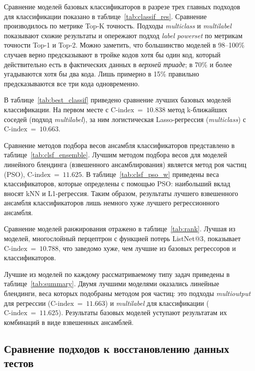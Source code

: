 Сравнение моделей базовых классификаторов в разрезе трех главных подходов для классификации показано в таблице~\ref{tab:classif_res}. Сравнение производилось по метрике Top-K точность. Подходы \emph{multiclass} и \emph{multilabel} показывают схожие результаты и опережают подход \emph{label powerset} по метрикам точности Top-1 и Top-2. Можно заметить, что большинство моделей в 98--100\% случаев верно предсказывают в тройке кодов хотя бы один код, который действительно есть в фактических данных в \emph{верхней триаде}; в 70\% и более угадываются хотя бы два кода. Лишь примерно в 15\% правильно предсказываются все три кода одновременно. 



В таблице~\ref{tab:best_classif} приведено сравнение лучших базовых моделей классификации. На первом месте с $\text{C‑index}~=~10.838$ метод k-ближайших соседей (подход \emph{multilabel}), за ним логистическая Lasso-регрессия (\emph{multiclass}) с $\text{C‑index}~=~10.663$.



Сравнение методов подбора весов ансамбля классификаторов представлено в таблице~\ref{tab:clsf_ensemble}. Лучшим методом подбора весов для моделей линейного блендинга (взвешенного ансамблирования) является метод роя частиц (PSO), $\text{C‑index}~=~11.625$. В таблице~\ref{tab:clsf_pso_w} приведены веса классификаторов, которые определены с помощью PSO: наибольший вклад вносят kNN и L1-регрессия. Таким образом, результаты лучшего взвешенного ансамбля классификаторов лишь немного хуже лучшего регрессионного ансамбля.



Сравнение моделей ранжирования отражено в таблице~\ref{tab:rank}. Лучшая из моделей, многослойный перцептрон с функцией потерь ListNet@3, показывает $\text{C‑index}~=~10.788$, что заведомо хуже, чем лучшие из базовых регрессоров и классификаторов.



Лучшие из моделей по каждому рассматриваемому типу задач приведены в таблице~\ref{tab:summary}. Двумя лучшими моделями оказались линейные блендинги, веса которых подобраны методом роя частиц: это подходы \emph{multioutput} для регрессии ($\text{C‑index}~=~11.663$) и \emph{multilabel} для классификации ($\text{C‑index}~=~11.625$). Результаты базовых моделей уступают результатам их комбинаций в виде взвешенных ансамблей. 

\subsection{Сравнение подходов к восстановлению данных тестов}

